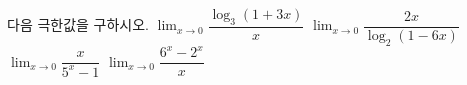 다음 극한값을 구하시오.
 $\displaystyle\lim_{x\to 0}\dfrac{\log_3(1+3x)}{x}$
 $\displaystyle\lim_{x\to 0}\dfrac{2x}{\log_2(1-6x)}$
 $\displaystyle\lim_{x\to 0}\dfrac{x}{5^x-1}$
 $\displaystyle\lim_{x\to 0}\dfrac{6^x-2^x}{x}$
